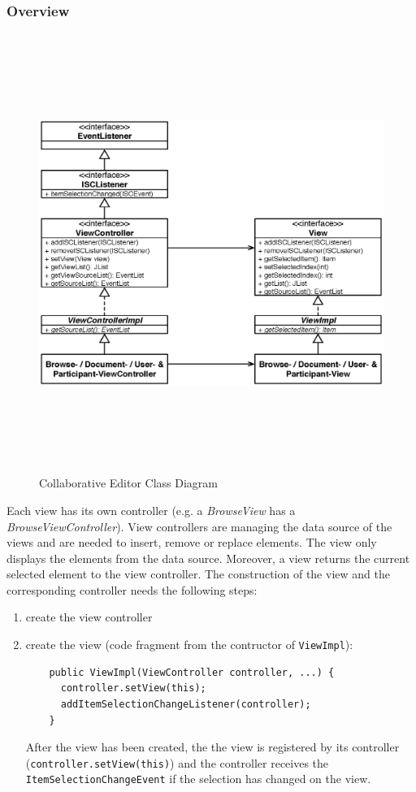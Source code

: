 \subsubsection{Overview}
\begin{figure}[H]
\begin{center}
  \includegraphics[height=5.62in, width=7.19in]{../images/finalreport/application_views_controllers.eps}
\caption{Collaborative Editor Class Diagram}
\label{application_views_controllers}
\end{center}
\end{figure}
Each view has its own controller (e.g. a \textit{BrowseView} has a \textit{BrowseViewController}). View controllers are managing the data source of the views and are needed to insert, remove or replace elements. The view only displays the elements from the data source. Moreover, a view returns the current selected element to the view controller. The construction of the view and the corresponding controller needs the following steps:
\begin{enumerate}
\item create the view controller
\item create the view (code fragment from the contructor of \texttt{ViewImpl}):
  \begin{verbatim}
    public ViewImpl(ViewController controller, ...) {
      controller.setView(this);
      addItemSelectionChangeListener(controller);
    }
  \end{verbatim}
  After the view has been created, the the view is registered by its controller (\texttt{controller.setView(this)}) and the controller receives the \texttt{ItemSelectionChangeEvent} if the selection has changed on the view.
\end{enumerate}
